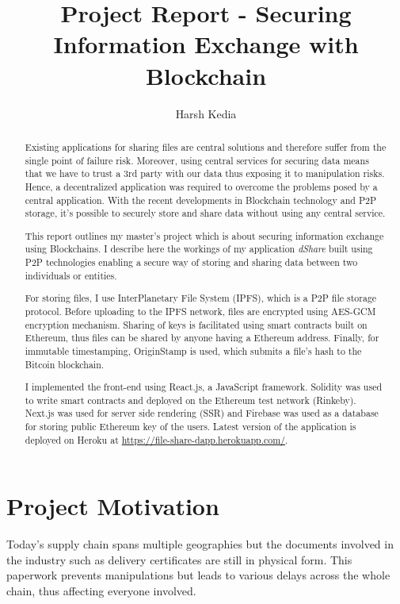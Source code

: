 \documentclass[]{article}
\title{Project Report - Securing Information Exchange with Blockchain}
\author{Harsh Kedia}
\begin{document}
	\maketitle
	\newpage

	\begin{abstract}
		Existing applications for sharing files are central solutions and therefore suffer from the single point of failure risk. Moreover, using central services for securing data means that we have to trust a 3rd party with our data thus exposing it to manipulation risks. Hence, a decentralized application was required to overcome the problems posed by a central application. With the recent developments in Blockchain technology and P2P storage, it's possible to securely store and share data without using any central service.
		
		This report outlines my master's project which is about securing information exchange using Blockchains. I describe here the workings of my application \textit{dShare} built using P2P technologies enabling a secure way of storing and sharing data between two individuals or entities.
		
		For storing files, I use InterPlanetary File System (IPFS), which is a P2P file storage protocol. Before uploading to the IPFS network, files are encrypted using AES-GCM encryption mechanism. Sharing of keys is facilitated using smart contracts built on Ethereum, thus files can be shared by anyone having a Ethereum address. Finally, for immutable timestamping, OriginStamp is used, which submits a file's hash to the Bitcoin blockchain.
				
		I implemented the front-end using React.js, a JavaScript framework. Solidity was used to write smart contracts and deployed on the Ethereum test network (Rinkeby). Next.js was used for server side rendering (SSR) and Firebase was used as a database for storing public Ethereum key of the users. Latest version of the application is deployed on Heroku at \href{https://file-share-dapp.herokuapp.com/}{https://file-share-dapp.herokuapp.com/}.
	\end{abstract}
	
	\newpage
	\section{Project Motivation}
		Today's supply chain spans multiple geographies but the documents involved in the industry such as delivery certificates are still in physical form. This paperwork prevents manipulations but leads to various delays across the whole chain, thus affecting everyone involved.
		
\end{document}
